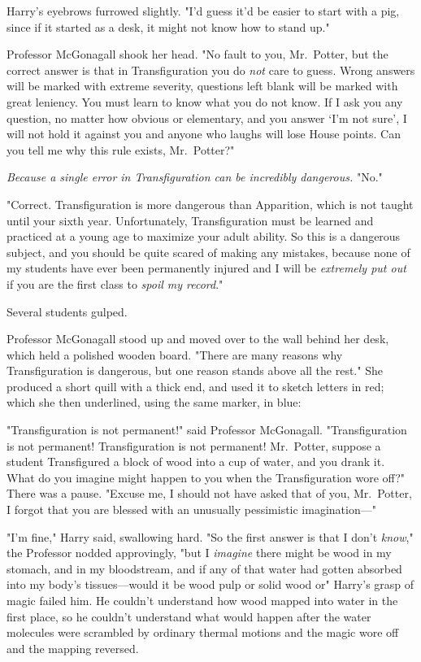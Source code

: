 Harry's eyebrows furrowed slightly. "I'd guess it'd be easier to start with a
pig, since if it started as a desk, it might not know how to stand up."

Professor McGonagall shook her head. "No fault to you, Mr.~Potter, but the
correct answer is that in Transfiguration you do \emph{not} care to guess.
Wrong answers will be marked with extreme severity, questions left blank will
be marked with great leniency. You must learn to know what you do not know. If
I ask you any question, no matter how obvious or elementary, and you answer
`I'm not sure', I will not hold it against you and anyone who laughs will lose
House points. Can you tell me why this rule exists, Mr.~Potter?"

\emph{Because a single error in Transfiguration can be incredibly dangerous.}
"No."

"Correct. Transfiguration is more dangerous than Apparition, which is not
taught until your sixth year. Unfortunately, Transfiguration must be learned
and practiced at a young age to maximize your adult ability. So this is a
dangerous subject, and you should be quite scared of making any mistakes,
because none of my students have ever been permanently injured and I will be
\emph{extremely put out} if you are the first class to \emph{spoil my record}."

Several students gulped.

Professor McGonagall stood up and moved over to the wall behind her desk, which
held a polished wooden board. "There are many reasons why Transfiguration is
dangerous, but one reason stands above all the rest." She produced a short
quill with a thick end, and used it to sketch letters in red; which she then
underlined, using the same marker, in blue:


"Transfiguration is not permanent!" said Professor McGonagall. "Transfiguration
is not permanent! Transfiguration is not permanent! Mr.~Potter, suppose a
student Transfigured a block of wood into a cup of water, and you drank it.
What do you imagine might happen to you when the Transfiguration wore off?"
There was a pause. "Excuse me, I should not have asked that of you, Mr.~Potter,
I forgot that you are blessed with an unusually pessimistic imagination—"

"I'm fine," Harry said, swallowing hard. "So the first answer is that I don't
\emph{know}," the Professor nodded approvingly, "but I \emph{imagine} there
might be{\el} wood in my stomach, and in my bloodstream, and if any of that
water had gotten absorbed into my body's tissues—would it be wood pulp or
solid wood or{\el}" Harry's grasp of magic failed him. He couldn't
understand how wood mapped into water in the first place, so he couldn't
understand what would happen after the water molecules were scrambled by
ordinary thermal motions and the magic wore off and the mapping reversed.


